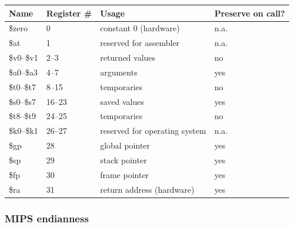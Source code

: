\begin{center}
\begin{tabular}{@{}llll@{}}
\toprule
Name & Register \# & Usage & Preserve on call? \\
\midrule
\$zero      & 0     & constant 0 (hardware)         & n.a. \\
\$at        & 1     & reserved for assembler        & n.a. \\
\$v0--\$v1  & 2--3  & returned values                & no \\
\$a0--\$a3  & 4--7  & arguments                      & yes \\
\$t0--\$t7  & 8--15 & temporaries                    & no \\
\$s0--\$s7  & 16--23& saved values                   & yes \\
\$t8--\$t9  & 24--25& temporaries                    & no \\
\$k0--\$k1  & 26--27& reserved for operating system  & n.a. \\
\$gp        & 28    & global pointer                 & yes \\
\$sp        & 29    & stack pointer                  & yes \\
\$fp        & 30    & frame pointer                  & yes \\
\$ra        & 31    & return address (hardware)      & yes \\
\bottomrule
\end{tabular}
\end{center}

\subsubsection{MIPS endianness}

